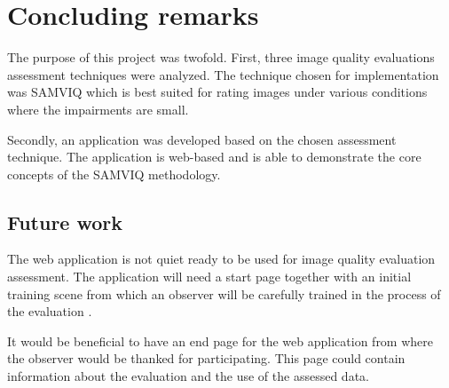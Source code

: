\graphicspath{{Chapters/ConcudingRemarks/}}

\chapter{Concluding remarks} %
\label{cha:concluding_remarks}

The purpose of this project was twofold. First, three image quality evaluations assessment techniques were analyzed. The technique chosen for implementation was SAMVIQ which is best suited for rating images under various conditions where the impairments are small.

Secondly, an application was developed based on the chosen assessment technique. The application is web-based and is able to demonstrate the core concepts of the SAMVIQ methodology.

\section{Future work} %
\label{sec:future_work}

The web application is not quiet ready to be used for image quality evaluation assessment. The application will need a start page together with an initial training scene from which an observer will be carefully trained in the process of the evaluation \cite{Kozamernik2005}.

It would be beneficial to have an end page for the web application from where the observer would be thanked for participating. This page could contain information about the evaluation and the use of the assessed data.


